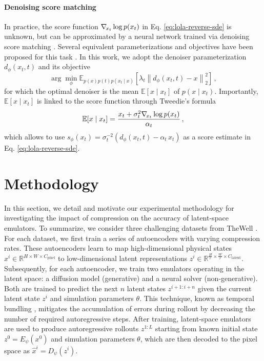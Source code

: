 \paragraph{Denoising score matching}
In practice, the score function $\nabla_{\!{x_t}} \log p(x_t)$ in Eq. \eqref{eq:lola-reverse-sde} is unknown, but can be approximated by a neural network trained via denoising score matching \cite{hyvarinen2005estimation, vincent2011connection}. Several equivalent parameterizations and objectives have been proposed for this task \cite{song2019generative, ho2020denoising, song2021denoising, song2021scorebased, karras2022elucidating, lipman2023flow}. In this work, we adopt the denoiser parameterization $d_\phi(x_t, t)$ and its objective \cite{karras2022elucidating}
\begin{equation} \label{eq:lola-denoiser-objective}
    \arg\min_\phi \mathbb{E}_{p(x) p(t) p(x_t \mid x)} \left[ \lambda_t \left\| d_\phi(x_t, t) - x \right\|_2^2 \right] \, ,
\end{equation}
for which the optimal denoiser is the mean $\mathbb{E}[x \mid x_t]$ of $p(x \mid x_t)$. Importantly, $\mathbb{E}[x \mid x_t]$ is linked to the score function through Tweedie's formula \cite{tweedie1947functions, efron2011tweedies, kim2021noise2score, meng2021estimating}
\begin{equation} \label{eq:lola-optimal-denoiser}
    \mathbb{E}[x \mid x_t] = \frac{x_t + \sigma_t^2 \nabla_{\!{x_t}} \log p(x_t)}{\alpha_t} \, ,
\end{equation}
which allows to use $s_\phi(x_t) = \sigma_t^{-2} (d_\phi(x_t, t) - \alpha_t \, x_t)$ as a score estimate in Eq. \eqref{eq:lola-reverse-sde}.

\section{Methodology} \label{sec:lola-methodology}

In this section, we detail and motivate our experimental methodology for investigating the impact of compression on the accuracy of latent-space emulators. To summarize, we consider three challenging datasets from TheWell \cite{ohana2024well}. For each dataset, we first train a series of autoencoders with varying compression rates. These autoencoders learn to map high-dimensional physical states $x^i \in \mathbb{R}^{H \times W \times C_\text{pixel}}$ to low-dimensional latent representations $z^i \in \mathbb{R}^{\frac{H}{r} \times \frac{W}{r} \times C_\text{latent}}$. Subsequently, for each autoencoder, we train two emulators operating in the latent space: a diffusion model (generative) and a neural solver (non-generative). Both are trained to predict the next $n$ latent states $z^{i+1:i+n}$ given the current latent state $z^i$ and simulation parameters $\theta$. This technique, known as temporal bundling \cite{brandstetter2022message}, mitigates the accumulation of errors during rollout by decreasing the number of required autoregressive steps. After training, latent-space emulators are used to produce autoregressive rollouts $z^{1:L}$ starting from known initial state $z^0 = E_\psi(x^0)$ and simulation parameters $\theta$, which are then decoded to the pixel space as $\hat{x}^i = D_\psi(z^i)$.

